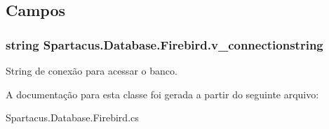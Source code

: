 \subsection{Campos}
\hypertarget{classSpartacus_1_1Database_1_1Firebird_afb3d04d42e84e18c12d75bed71fb0b45}{
\subsubsection[{v\+\_\+connectionstring}]{\setlength{\rightskip}{0pt plus 5cm}string Spartacus.\+Database.\+Firebird.\+v\+\_\+connectionstring}}\label{classSpartacus_1_1Database_1_1Firebird_afb3d04d42e84e18c12d75bed71fb0b45}


String de conexão para acessar o banco. 



A documentação para esta classe foi gerada a partir do seguinte arquivo\+:\begin{DoxyCompactItemize}
\item 
Spartacus.\+Database.\+Firebird.\+cs\end{DoxyCompactItemize}

